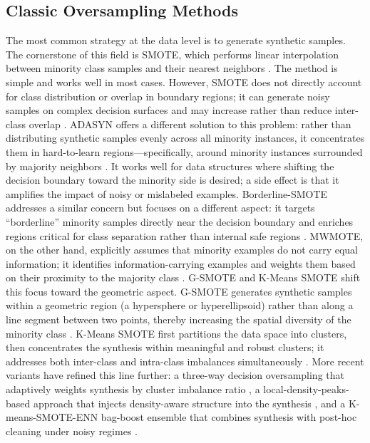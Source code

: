 \documentclass[pdflatex]{sn-jnl}
\begin{document}
\subsection{Classic Oversampling Methods}

The most common strategy at the data level is to generate synthetic samples. The cornerstone of this field is SMOTE, which performs linear interpolation between minority class samples and their nearest neighbors \cite{ref07}. The method is simple and works well in most cases. However, SMOTE does not directly account for class distribution or overlap in boundary regions; it can generate noisy samples on complex decision surfaces and may increase rather than reduce inter-class overlap \cite{ref02} \cite{ref24}. ADASYN offers a different solution to this problem: rather than distributing synthetic samples evenly across all minority instances, it concentrates them in hard-to-learn regions---specifically, around minority instances surrounded by majority neighbors \cite{ref18}. It works well for data structures where shifting the decision boundary toward the minority side is desired; a side effect is that it amplifies the impact of noisy or mislabeled examples. Borderline-SMOTE addresses a similar concern but focuses on a different aspect: it targets ``borderline'' minority samples directly near the decision boundary and enriches regions critical for class separation rather than internal safe regions \cite{ref13}. MWMOTE, on the other hand, explicitly assumes that minority examples do not carry equal information; it identifies information-carrying examples and weights them based on their proximity to the majority class \cite{ref19}. G-SMOTE and K-Means SMOTE shift this focus toward the geometric aspect. G-SMOTE generates synthetic samples within a geometric region (a hypersphere or hyperellipsoid) rather than along a line segment between two points, thereby increasing the spatial diversity of the minority class \cite{ref20}. K-Means SMOTE first partitions the data space into clusters, then concentrates the synthesis within meaningful and robust clusters; it addresses both inter-class and intra-class imbalances simultaneously \cite{ref25}. More recent variants have refined this line further: a three-way decision oversampling that adaptively weights synthesis by cluster imbalance ratio \cite{ref26}, a local-density-peaks-based approach that injects density-aware structure into the synthesis \cite{ref27}, and a K-means-SMOTE-ENN bag-boost ensemble that combines synthesis with post-hoc cleaning under noisy regimes \cite{ref28}.
\end{document}
